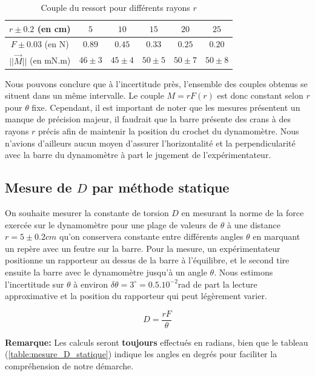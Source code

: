 \documentclass[11pt]{article}
\begin{document}
\begin{table}[h!]
	\centering
	\begin{tabular}{||c | c c c c c||} 
		\hline
		$r \pm 0.2$ (en cm) & $5$ & $10$ & $15$ & $20$ & $25$ \\
		\hline
        $F \pm 0.03$ (en N) & $0.89$ & $0.45$ & $0.33$ & $0.25$ & $0.20$ \\
		\hline
        $|| \vec{M} ||$ (en mN.m) & $46 \pm 3$ & $45 \pm 4$ & $50 \pm 5$ & $50 \pm 7$ & $50 \pm 8$ \\
        \hline
    \end{tabular}
	\caption{Couple du ressort pour différents rayons $r$}
	\label{table:couple_r_variable}
\end{table}

Nous pouvons conclure que à l'incertitude près, l'ensemble des couples obtenus se situent dans un même intervalle. Le couple $M = rF(r)$ 
est donc constant selon $r$ pour $\theta$ fixe. Cependant, il est important de noter que les mesures présentent un manque de précision majeur,
il faudrait que la barre présente des crans à des rayons $r$ précis afin de maintenir la position du crochet du dynamomètre. Nous n'avions d'ailleurs
aucun moyen d'assurer l'horizontalité et la perpendicularité avec la barre du dynamomètre à part le jugement de l'expérimentateur.

\subsection{Mesure de $D$ par méthode statique}
\label{D_statique}

On souhaite mesurer la constante de torsion $D$ en mesurant la norme de la force exercée sur le dynamomètre 
pour une plage de valeurs de $\theta$ à une distance $r=5 \pm 0.2cm$ qu'on conservera constante entre différents 
angles $\theta$ en marquant un repère avec un feutre sur la barre. Pour la mesure, un expérimentateur positionne un
rapporteur au dessus de la barre à l'équilibre, et le second tire ensuite la barre avec le dynamomètre jusqu'à un angle $\theta$. 
Nous estimons l'incertitude sur $\theta$ à environ $\delta \theta = 3^{\circ} = 0.5.10^{-2}$rad de part la lecture approximative et la position
du rapporteur qui peut légèrement varier.

\begin{equation}
    D = \frac{rF}{\theta}
\end{equation}

\textbf{Remarque:} Les calculs seront \textbf{toujours} effectués en radians, bien que le tableau (\ref{table:mesure_D_statique}) indique
les angles en degrés pour faciliter la compréhension de notre démarche.
\end{document}
